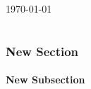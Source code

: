 \documentclass[12pt]{article}
\begin{document}
\begin{titlepage}
    \center %

    {\large \today}\\[2cm] %

    \newpage 

    \tableofcontents

    \newpage

    \listoffigures

    \newpage

    \lstlistoflistings

\end{titlepage}
\part{}

\section{New Section}

\subsection{New Subsection}
\end{document}

